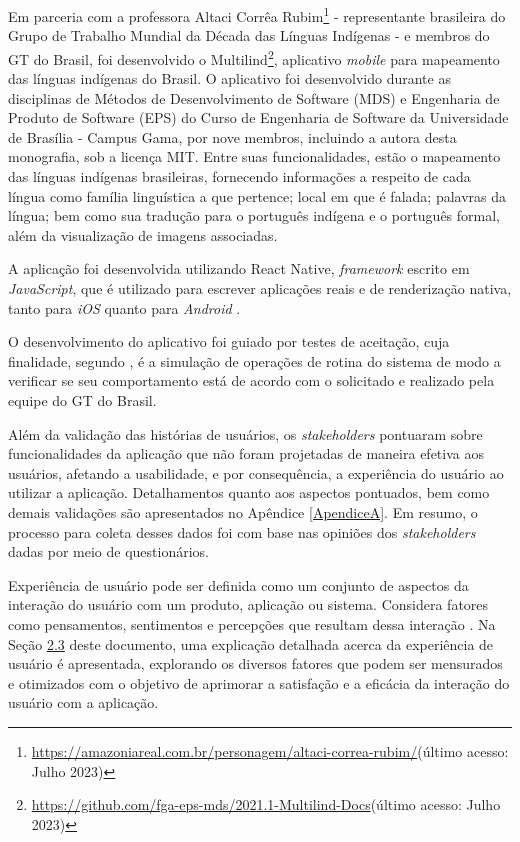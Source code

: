 Em parceria com a professora Altaci Corrêa Rubim\footnote{\url{https://amazoniareal.com.br/personagem/altaci-correa-rubim/}(último acesso: Julho 2023)} - representante
brasileira do Grupo de Trabalho Mundial da Década das Línguas Indígenas - e membros do GT do Brasil, foi desenvolvido o
Multilind\footnote{\url{https://github.com/fga-eps-mds/2021.1-Multilind-Docs}(último acesso: Julho 2023)}, aplicativo \textit{mobile} para mapeamento das línguas
indígenas do Brasil. O aplicativo foi desenvolvido durante as disciplinas de Métodos de Desenvolvimento de Software (MDS) e Engenharia de Produto de Software (EPS) do
Curso de Engenharia de Software da Universidade de Brasília - Campus Gama, por nove membros, incluindo a autora desta monografia, sob a licença MIT. Entre suas funcionalidades, estão o mapeamento das línguas
indígenas brasileiras, fornecendo informações a respeito de cada língua como família linguística a que pertence; local em que é falada; palavras da língua; bem como sua
tradução para o português indígena e o português formal, além da visualização de imagens associadas.

A aplicação foi desenvolvida utilizando React Native, \textit{framework} escrito em \textit{JavaScript}, que é utilizado para escrever aplicações reais e de
renderização nativa, tanto para \textit{iOS} quanto para \textit{Android} \cite{eiseman2017}.

O desenvolvimento do aplicativo foi guiado por testes de aceitação, cuja finalidade, segundo , é a simulação de operações de rotina do sistema de
modo a verificar se seu comportamento está de acordo com o solicitado e realizado pela equipe do GT do Brasil.

Além da validação das histórias de usuários, os \textit{stakeholders} pontuaram sobre funcionalidades da aplicação que não foram projetadas de maneira efetiva aos
usuários, afetando a usabilidade, e por consequência, a experiência do usuário ao utilizar a aplicação. Detalhamentos quanto aos aspectos pontuados, bem como demais validações 
são apresentados no Apêndice \ref{ApendiceA}. Em resumo, o processo para coleta desses dados foi com base nas opiniões dos \textit{stakeholders} dadas por meio de questionários.

Experiência de usuário pode ser definida como um conjunto de aspectos da interação do usuário com um produto, aplicação ou sistema. Considera fatores como pensamentos,
sentimentos e percepções que resultam dessa interação \cite{tulis2013}. Na Seção \hyperref[sec:Experiencia de Usuario]{2.3} deste documento, uma explicação detalhada acerca da experiência de usuário é 
apresentada, explorando os diversos fatores que podem ser mensurados e otimizados com o objetivo de aprimorar a satisfação e a eficácia da interação do usuário com a aplicação.

